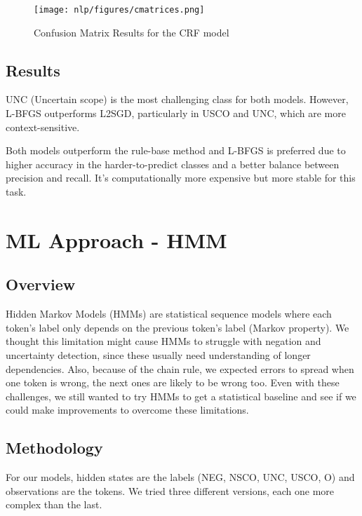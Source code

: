 \documentclass[9pt,a4paper,twoside]{tau-class/tau}
\begin{document}
        \begin{figure}[H]
            \centering
            \texttt{[image: nlp/figures/cmatrices.png]}
            \label{fig:confusion_matrix_eval}
            \caption{Confusion Matrix Results for the CRF model}
        \end{figure} 
        
    \subsection{Results}
        UNC (Uncertain scope) is the most challenging class for both models. However, L-BFGS outperforms L2SGD, particularly in USCO and UNC, which are more context-sensitive.

        Both models outperform the rule-base method and L-BFGS is preferred due to higher accuracy in the harder-to-predict classes and a better balance between precision and recall. It's computationally more expensive but more stable for this task. 

\section{ML Approach - HMM} \label{sec:hmm-based}
    \subsection{Overview}
        Hidden Markov Models (HMMs) are statistical sequence models where each token's label only depends on the previous token's label (Markov property). We thought this limitation might cause HMMs to struggle with negation and uncertainty detection, since these usually need understanding of longer dependencies. Also, because of the chain rule, we expected errors to spread when one token is wrong, the next ones are likely to be wrong too. Even with these challenges, we still wanted to try HMMs to get a statistical baseline and see if we could make improvements to overcome these limitations.
    \subsection{Methodology}
        For our models, hidden states are the labels (NEG, NSCO, UNC, USCO, O) and observations are the tokens. We tried three different versions, each one more complex than the last.
        
\end{document}
